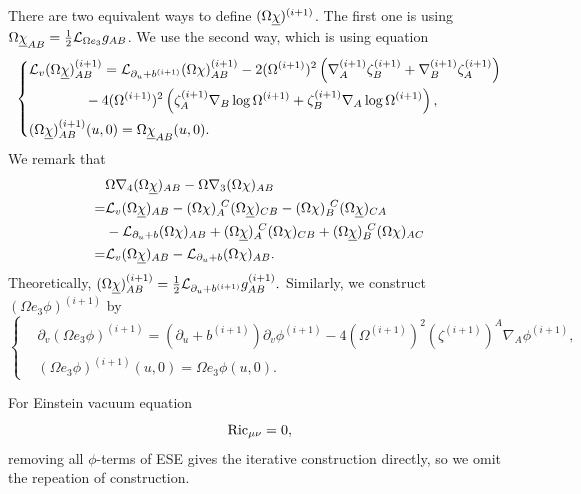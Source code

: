 There are two equivalent ways to define $(\Omega\underline\chi)^{(i+1)}$. The first one is using $\Omega\underline\chi_{AB}=\frac{1}{2}\mathcal L_{\Omega e_3}g_{AB}$. We use the second way, which is using equation
\begin{equation}
    \left\{\begin{aligned}
        &\mathcal L_{v}(\Omega\underline\chi)^{(i+1)}_{AB}= \mathcal L_{\partial_u+b^{(i+1)}}(\Omega\chi)^{(i+1)}_{AB}-2(\Omega^{(i+1)})^2\left(\nabla^{(i+1)}_A\zeta^{(i+1)}_B+\nabla^{(i+1)}_B\zeta^{(i+1)}_A\right)\\
        &\qquad\qquad-4(\Omega^{(i+1)})^2\left(\zeta^{(i+1)}_A\nabla_B\log\Omega^{(i+1)}+\zeta^{(i+1)}_B\nabla_A\log\Omega^{(i+1)}\right),\\
        &(\Omega\underline\chi)^{(i+1)}_{AB}(u,0)= \Omega\underline\chi_{AB}(u,0).
    \end{aligned}\right.
\end{equation}
We remark that
\begin{equation}
    \begin{aligned}
        &\Omega\nabla_4(\Omega\chib)_{AB}-\Omega\nabla_3(\Omega\chi)_{AB}\\
        =&\Lie_{v}(\Omega\chib)_{AB}-(\Omega\chi)_{A}^{\ C}(\Omega\chib)_{CB}-(\Omega\chi)_{B}^{\ C}(\Omega\chib)_{CA}\\
        &-\Lie_{\partial_u+b}(\Omega\chi)_{AB}+(\Omega\chib)_{A}^{\ C}(\Omega\chi)_{CB}+(\Omega\chib)_{B}^{\ C}(\Omega\chi)_{AC}\\
        =&\Lie_{v}(\Omega\chib)_{AB}-\Lie_{\partial_u+b}(\Omega\chi)_{AB}.
    \end{aligned}
\end{equation}
Theoretically, $(\Omega\underline\chi)_{AB}^{(i+1)}=\frac{1}{2}\mathcal L_{\partial_u+b^{(i+1)}}g^{(i+1)}_{AB}.$ Similarly, we construct $(\Omega e_3\phi)^{(i+1)}$ by
\begin{equation}
    \left\{\begin{aligned}
        &\partial_v(\Omega e_3\phi)^{(i+1)}=(\partial_u+b^{(i+1)})\partial_v\phi^{(i+1)}-4(\Omega^{(i+1)})^2(\zeta^{(i+1)})^A\nabla_A\phi^{(i+1)},\\
        &(\Omega e_3\phi)^{(i+1)}(u,0)=\Omega e_3\phi(u,0).
    \end{aligned}\right.
\end{equation}

For Einstein vacuum equation
\[\operatorname{Ric}_{\mu\nu}=0,\]
removing all $\phi$-terms of ESE gives the iterative construction directly, so we omit the repeation of construction. 


